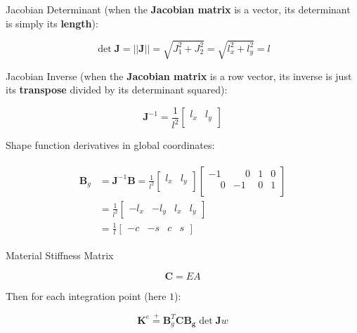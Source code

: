 \documentclass[10pt,b5paper,titlepage]{book}
\newcommand{\m}{\mathbf}
\newcommand*\eqp{\stackrel{+}{=}}
\newenvironment{eqarray}
{
    \begin{eqnarray}
        \begin{aligned}
}
{
        \end{aligned}
    \end{eqnarray}
}
\begin{document}
Jacobian Determinant (when the \textbf{Jacobian matrix} is a vector, its
determinant is simply its \textbf{length}):

\begin{equation}
    \det \m{J} = || \m{J} || = \sqrt{J_1^2 + J_2^2} = \sqrt{l_x^2 + l_y^2} = l
\end{equation}

Jacobian Inverse (when the \textbf{Jacobian matrix} is a row vector, its inverse
is just its \textbf{transpose} divided by its determinant squared):

\begin{equation}
    \m{J}^{-1} = \frac{1}{l^2}
    \begin{bmatrix}
        l_x & l_y \\
    \end{bmatrix}
\end{equation}

Shape function derivatives in global coordinates:

\begin{eqarray}
    \m{B}_g
    &= \m{J}^{-1} \m{B} = \frac{1}{l^2}
    \begin{bmatrix}
        l_x & l_y \\
    \end{bmatrix}
    \begin{bmatrix}
        -1 & \phantom{-}0 & 1 & 0 \\
        \phantom{-}0 & -1 & 0 & 1  \\
    \end{bmatrix} \\
    &= \frac{1}{l^2}
    \begin{bmatrix}
        -l_x & -l_y & l_x & l_y
    \end{bmatrix} \\
    &= \frac{1}{l}
    \begin{bmatrix}
        -c & -s & c & s
    \end{bmatrix}
\end{eqarray}

Material Stiffness Matrix

\begin{equation}
    \m{C} = EA
\end{equation}

Then for each integration point (here $1$):

\begin{equation}
    \m{K}^e \eqp \m{B}_g^T \m{C} \m{B_g} \det \m{J} w
\end{equation}
\end{document}

